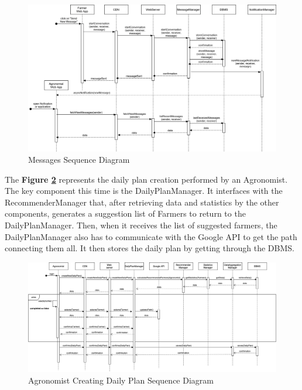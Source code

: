 \begin{figure}[hbt!]
\centering
\includegraphics[width=\textwidth]{../images_diagrams/dd/messagesSequenceDiagram.png}
\caption{Messages Sequence Diagram}
\label{fig:messagesSequenceDiagram}
\end{figure}

\noindent
The  \textbf{Figure \ref{fig:agronomistDailyPlanSequenceDiagram}} represents the daily plan creation performed by an Agronomist. The key component this time is the DailyPlanManager. It interfaces with the RecommenderManager that, after retrieving data and statistics by the other components, generates a suggestion list of Farmers to return to the DailyPlanManager. Then, when it receives the list of suggested farmers, the DailyPlanManager also has to communicate with the Google API to get the path connecting them all. It then stores the daily plan by getting through the DBMS.\\


\begin{figure}[hbt!]
\centering
\includegraphics[width=\textwidth]{../images_diagrams/dd/agronomist_sequencediagram.png}
\caption{Agronomist Creating Daily Plan Sequence Diagram}
\label{fig:agronomistDailyPlanSequenceDiagram}
\end{figure}

